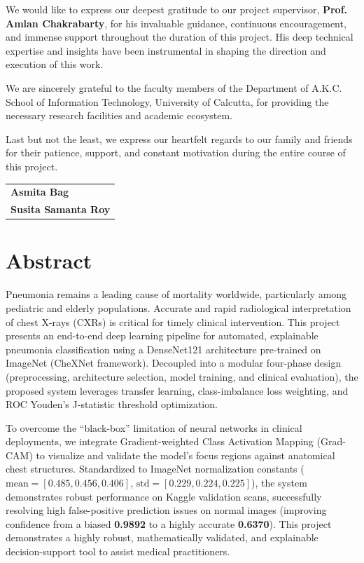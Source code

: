 \documentclass[12pt,oneside]{report}
\begin{document}
We would like to express our deepest gratitude to our project supervisor, \textbf{Prof. Amlan Chakrabarty}, for his invaluable guidance, continuous encouragement, and immense support throughout the duration of this project. His deep technical expertise and insights have been instrumental in shaping the direction and execution of this work.

\vspace*{0.5cm}
\noindent We are sincerely grateful to the faculty members of the Department of A.K.C. School of Information Technology, University of Calcutta, for providing the necessary research facilities and academic ecosystem.

\vspace*{0.5cm}
\noindent Last but not the least, we express our heartfelt regards to our family and friends for their patience, support, and constant motivation during the entire course of this project.

\vspace*{1.5cm}
\begin{flushright}
    \begin{tabular}{l}
        \textbf{Asmita Bag} \\
        \textbf{Susita Samanta Roy}
    \end{tabular}
\end{flushright}

\newpage
\chapter*{Abstract}

Pneumonia remains a leading cause of mortality worldwide, particularly among pediatric and elderly populations. Accurate and rapid radiological interpretation of chest X-rays (CXRs) is critical for timely clinical intervention. This project presents an end-to-end deep learning pipeline for automated, explainable pneumonia classification using a DenseNet121 architecture pre-trained on ImageNet (CheXNet framework). Decoupled into a modular four-phase design (preprocessing, architecture selection, model training, and clinical evaluation), the proposed system leverages transfer learning, class-imbalance loss weighting, and ROC Youden's J-statistic threshold optimization. 

To overcome the ``black-box'' limitation of neural networks in clinical deployments, we integrate Gradient-weighted Class Activation Mapping (Grad-CAM) to visualize and validate the model's focus regions against anatomical chest structures. Standardized to ImageNet normalization constants ($\text{mean}=[0.485, 0.456, 0.406]$, $\text{std}=[0.229, 0.224, 0.225]$), the system demonstrates robust performance on Kaggle validation scans, successfully resolving high false-positive prediction issues on normal images (improving confidence from a biased \textbf{0.9892} to a highly accurate \textbf{0.6370}). This project demonstrates a highly robust, mathematically validated, and explainable decision-support tool to assist medical practitioners.
\end{document}
